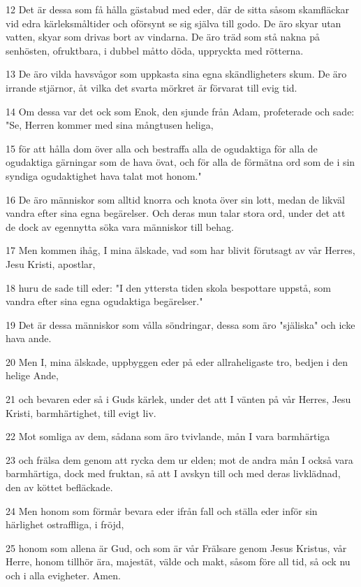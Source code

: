 \par 12 Det är dessa som få hålla gästabud med eder, där de sitta såsom skamfläckar vid edra kärleksmåltider och oförsynt se sig själva till godo. De äro skyar utan vatten, skyar som drivas bort av vindarna. De äro träd som stå nakna på senhösten, ofruktbara, i dubbel måtto döda, uppryckta med rötterna.
\par 13 De äro vilda havsvågor som uppkasta sina egna skändligheters skum. De äro irrande stjärnor, åt vilka det svarta mörkret är förvarat till evig tid.
\par 14 Om dessa var det ock som Enok, den sjunde från Adam, profeterade och sade: "Se, Herren kommer med sina mångtusen heliga,
\par 15 för att hålla dom över alla och bestraffa alla de ogudaktiga för alla de ogudaktiga gärningar som de hava övat, och för alla de förmätna ord som de i sin syndiga ogudaktighet hava talat mot honom."
\par 16 De äro människor som alltid knorra och knota över sin lott, medan de likväl vandra efter sina egna begärelser. Och deras mun talar stora ord, under det att de dock av egennytta söka vara människor till behag.
\par 17 Men kommen ihåg, I mina älskade, vad som har blivit förutsagt av vår Herres, Jesu Kristi, apostlar,
\par 18 huru de sade till eder: "I den yttersta tiden skola bespottare uppstå, som vandra efter sina egna ogudaktiga begärelser."
\par 19 Det är dessa människor som vålla söndringar, dessa som äro "själiska" och icke hava ande.
\par 20 Men I, mina älskade, uppbyggen eder på eder allraheligaste tro, bedjen i den helige Ande,
\par 21 och bevaren eder så i Guds kärlek, under det att I vänten på vår Herres, Jesu Kristi, barmhärtighet, till evigt liv.
\par 22 Mot somliga av dem, sådana som äro tvivlande, mån I vara barmhärtiga
\par 23 och frälsa dem genom att rycka dem ur elden; mot de andra mån I också vara barmhärtiga, dock med fruktan, så att I avskyn till och med deras livklädnad, den av köttet befläckade.
\par 24 Men honom som förmår bevara eder ifrån fall och ställa eder inför sin härlighet ostraffliga, i fröjd,
\par 25 honom som allena är Gud, och som är vår Frälsare genom Jesus Kristus, vår Herre, honom tillhör ära, majestät, välde och makt, såsom före all tid, så ock nu och i alla evigheter. Amen.


